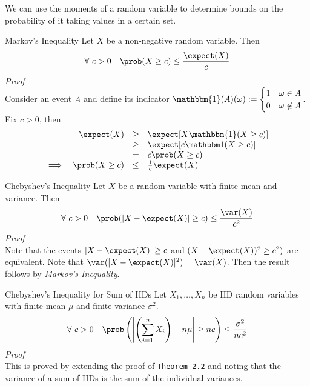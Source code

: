 \documentclass[11pt,a4paper]{article}
\begin{document}
\begin{remark}{We can use the moments of a random variable to determine bounds on the probability of it taking values in a certain set.}
\end{remark}

\begin{theorem}{Markov's Inequality}
  Let $X$ be a non-negative random variable. Then
  \[ \forall\ c>0\quad\prob(X\geq c)\leq\frac{\expect(X)}c \]
  \textit{Proof}\\
  Consider an event $A$ and define its indicator $\mathbbm{1}(A)(\omega):=\begin{cases}1&\omega\in A\\0&\omega\not\in A\end{cases}$. Fix $c>0$, then
  \[\begin{array}{rrcl}
    &\expect(X)&\geq&\expect[X\mathbbm{1}(X\geq c)]\\
    &&\geq&\expect[c\mathbbm1(X\geq c)]\\
    &&=&c\prob(X\geq c)\\
    \implies&\prob(X\geq c)&\leq&\frac1c\expect(X)
  \end{array}\]
\end{theorem}

\begin{theorem}{Chebyshev's Inequality}
  Let $X$ be a random-variable with finite mean and variance. Then
  \[ \forall\ c>0\quad\prob(|X-\expect(X)|\geq c)\leq\frac{\var(X)}{c^2}\]
  \textit{Proof}\\
  Note that the events $|X-\expect(X)|\geq c$ and $(X-\expect(X))^2\ge c^2)$ are equivalent. Note that $\var([X-\expect(X)]^2)=\var(X)$. Then the result follows by \textit{Markov's Inequality}.
\end{theorem}

\begin{theorem}{Chebyshev's Inequality for Sum of IIDs}
  Let $X_1,\dots,X_n$ be IID random variables with finite mean $\mu$ and finite variance $\sigma^2$.
  \[ \forall\ c>0\quad\prob\left(\left|\left(\sum_{i=1}^nX_i\right)-n\mu\right|\geq nc\right)\leq\frac{\sigma^2}{nc^2} \]
  \textit{Proof}\\
  This is proved by extending the proof of \texttt{Theorem 2.2} and noting that the variance of a sum of IIDs is the sum of the individual variances.
\end{theorem}
\end{document}
